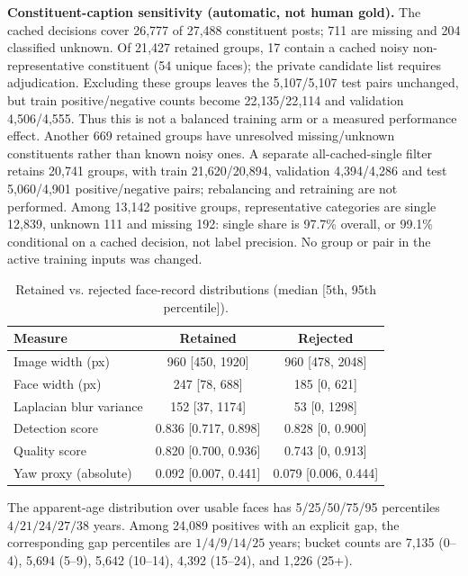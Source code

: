 \documentclass[journal]{IEEEtran}
\begin{document}
\textbf{Constituent-caption sensitivity (automatic, not human gold).}
The cached decisions cover 26{,}777 of 27{,}488 constituent posts; 711 are missing
and 204 classified unknown. Of 21{,}427 retained groups, 17 contain a cached noisy
non-representative constituent (54 unique faces); the private candidate list requires
adjudication. Excluding these groups leaves the 5{,}107/5{,}107 test pairs unchanged,
but train positive/negative counts become 22{,}135/22{,}114 and validation 4{,}506/4{,}555.
Thus this is not a balanced training arm or a measured performance effect.
Another 669 retained groups have unresolved missing/unknown constituents rather than
known noisy ones. A separate all-cached-single filter retains 20{,}741 groups, with
train 21{,}620/20{,}894, validation 4{,}394/4{,}286 and test 5{,}060/4{,}901 positive/negative
pairs; rebalancing and retraining are not performed. Among 13{,}142 positive groups,
representative categories are single 12{,}839, unknown 111 and missing 192:
single share is 97.7\% overall, or 99.1\% conditional on a cached decision, not label precision.
No group or pair in the active training inputs was changed.

\begin{table}[!t]
\caption{Retained vs. rejected face-record distributions (median [5th, 95th percentile]).}
\label{tab:qualitydist}
\centering
\footnotesize
\begin{tabular}{@{}lcc@{}}
\toprule
Measure & Retained & Rejected \\
\midrule
Image width (px) & 960 [450, 1920] & 960 [478, 2048] \\
Face width (px) & 247 [78, 688] & 185 [0, 621] \\
Laplacian blur variance & 152 [37, 1174] & 53 [0, 1298] \\
Detection score & 0.836 [0.717, 0.898] & 0.828 [0, 0.900] \\
Quality score & 0.820 [0.700, 0.936] & 0.743 [0, 0.913] \\
Yaw proxy (absolute) & 0.092 [0.007, 0.441] & 0.079 [0.006, 0.444] \\
\bottomrule
\end{tabular}
\end{table}

The apparent-age distribution over usable faces has 5/25/50/75/95 percentiles
$4/21/24/27/38$ years. Among 24{,}089 positives with an explicit gap, the corresponding gap
percentiles are $1/4/9/14/25$ years; bucket counts are 7{,}135 (0--4), 5{,}694 (5--9), 5{,}642
(10--14), 4{,}392 (15--24), and 1{,}226 (25+).
\end{document}
